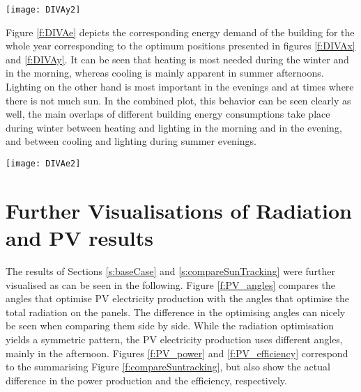 	\begin{figure*}
		\begin{center}
		\texttt{[image: DIVAy2]}
		\caption{Carpet plots detailing the optimal azimuth angles to minimise the (a) heating demand, (b) cooling demand, (c) lighting demand, and (d) total building energy demand. Cooling is minimized by blocking the sun, whereas lighting and heating are minimized by opening the facade to let the insolation in.}
		\label{f:DIVAy}
		\end{center}
	\end{figure*}

	Figure \ref{f:DIVAe} depicts the corresponding energy demand of the building for the whole year corresponding to the optimum positions presented in figures \ref{f:DIVAx} and \ref{f:DIVAy}. It can be seen that heating is most needed during the winter and in the morning, whereas cooling is mainly apparent in summer afternoons. Lighting on the other hand is most important in the evenings and at times where there is not much sun. In the combined plot, this behavior can be seen clearly as well, the main overlaps of different building energy consumptions take place during winter between heating and lighting in the morning and in the evening, and between cooling and lighting during summer evenings. 

	\begin{figure*}
		\begin{center}
		\texttt{[image: DIVAe2]}
		\caption{Carpet plots detailing the energy consumption during every hour of the year for the (a) heating demand, (b) cooling demand, (c) lighting demand, and (d) total building energy demand.}
		\label{f:DIVAe}
		\end{center}
	\end{figure*}
	


\section{Further Visualisations of Radiation and PV results}
\label{a:PV}

	The results of Sections \ref{s:baseCase} and \ref{s:compareSunTracking} were further visualised as can be seen in the following. Figure \ref{f:PV_angles} compares the angles that optimise PV electricity production with the angles that optimise the total radiation on the panels. The difference in the optimising angles can nicely be seen when comparing them side by side. While the radiation optimisation yields a symmetric pattern, the PV electricity production uses different angles, mainly in the afternoon. Figures \ref{f:PV_power} and \ref{f:PV_efficiency} correspond to the summarising Figure \ref{f:compareSuntracking}, but also show the actual difference in the power production and the efficiency, respectively. 

